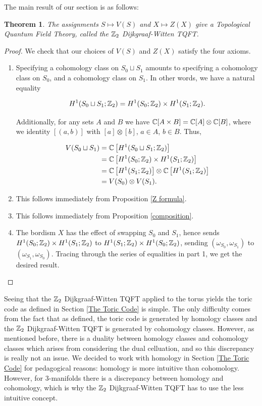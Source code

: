 \documentclass{article}
\newtheorem{theorem}{Theorem}[section]
\theoremstyle{definition}
\numberwithin{figure}{section}
\begin{document}
The main result of our section is as follows:

\begin{theorem} The assignments $S\mapsto V(S)$ and $X\mapsto Z(X)$ give a Topological Quantum Field Theory, called the $\mathbb{Z}_2$ Dijkgraaf-Witten TQFT.
\end{theorem}
\begin{proof} We check that our choices of $V(S)$ and $Z(X)$ satisfy the four axioms.

\begin{enumerate}
\item Specifying a cohomology class on $S_0\sqcup S_1$ amounts to specifying a cohomology class on $S_0$, and a cohomology class on $S_1$. In other words, we have a natural equality

$$H^1(S_0\sqcup S_1;\mathbb{Z}_2)=H^1(S_0;\mathbb{Z}_2)\times H^1(S_1;\mathbb{Z}_2).$$

Additionally, for any sets $A$ and $B$ we have $\mathbb{C}[A\times B]=\mathbb{C}[A]\otimes \mathbb{C}[B]$, where we identity $[(a,b)]$ with $[a]\otimes [b]$, $a\in A$, $b\in B$. Thus,

\begin{align*}
V(S_0\sqcup S_1)&=\mathbb{C}\left[H^1(S_0\sqcup S_1;\mathbb{Z}_2)\right]\\
&=\mathbb{C}\left[H^1(S_0;\mathbb{Z}_2)\times H^1(S_1;\mathbb{Z}_2)\right]\\
&=\mathbb{C}\left[H^1(S_1;\mathbb{Z}_2)\right]\otimes \mathbb{C}\left[ H^1(S_1;\mathbb{Z}_2)\right]\\
&=V(S_0)\otimes V(S_1).
\end{align*}

\item This follows immediately from Proposition \ref{Z formula}.
\item This follows immediately from Proposition \ref{composition}.
\item The bordism $X$ has the effect of swapping $S_0$ and $S_1$, hence sends $H^1(S_0;\mathbb{Z}_2)\times H^1(S_1;\mathbb{Z}_2)$ to $H^1(S_1;\mathbb{Z}_2)\times H^1(S_0;\mathbb{Z}_2)$, sending $(\omega_{S_0},\omega_{S_1})$ to $(\omega_{S_1},\omega_{S_0})$. Tracing through the series of equalities in part 1, we get the desired result.
\end{enumerate}
\end{proof}

Seeing that the $\mathbb{Z}_2$ Dijkgraaf-Witten TQFT applied to the torus yields the toric code as defined in Section \ref{The Toric Code} is simple. The only difficulty comes from the fact that as defined, the toric code is generated by homology classes and the $\mathbb{Z}_2$ Dijkgraaf-Witten TQFT is generated by cohomology classes. However, as mentioned before, there is a duality between homology classes and cohomology classes which arises from considering the dual celluation, and so this discrepancy is really not an issue. We decided to work with homology in Section \ref{The Toric Code} for pedagogical reasons: homology is more intuitive than cohomology. However, for 3-manifolds there is a discrepancy between homology and cohomology, which is why the $\mathbb{Z}_2$ Dijkgraaf-Witten TQFT has to use the less intuitive concept.
\end{document}
